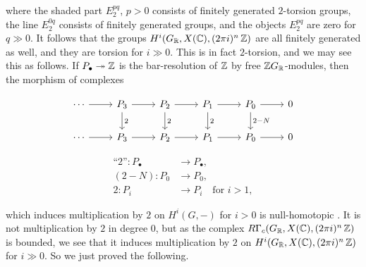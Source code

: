 \begin{center}

\end{center}

\noindent where the shaded part $E_2^{pq}$, $p > 0$ consists of finitely
generated $2$-torsion groups, the line $E_2^{0q}$ consists of finitely generated
groups, and the objects $E_2^{pq}$ are zero for $q \gg 0$. It follows that the
groups $H^i (G_{\mathbb{R}}, X (\mathbb{C}), (2\pi i)^n\,\mathbb{Z})$ are all finitely generated as
well, and they are torsion for $i \gg 0$. This is in fact $2$-torsion, and we
may see this as follows. If $P_\bullet \twoheadrightarrow \mathbb{Z}$ is the bar-resolution of $\mathbb{Z}$
by free $\mathbb{Z} G_{\mathbb{R}}$-modules, then the morphism of complexes

\[ \begin{tikzcd}
    \cdots\ar{r} & P_3\ar{r}\ar{d}{2} & P_2\ar{r}\ar{d}{2} & P_1\ar{r}\ar{d}{2} & P_0\ar{r}\ar{d}{2-N} & 0 \\
    \cdots\ar{r} & P_3\ar{r} & P_2\ar{r} & P_1\ar{r} & P_0\ar{r} & 0
  \end{tikzcd} \]

\begin{align*}
  \text{``}2\text{''}\colon P_\bullet & \to P_\bullet,\\
  (2-N)\colon P_0 & \to P_0,\\
  2\colon P_i & \to P_i \quad\text{for }i > 1,
\end{align*}

\noindent which induces multiplication by $2$ on $H^i (G,-)$ for $i > 0$ is
null-homotopic \cite[Theorem 6.5.8]{Weibel-94}. It is not multiplication by $2$
in degree $0$, but as the complex $R\Gamma_c (G_{\mathbb{R}}, X (\mathbb{C}), (2\pi i)^n\,\mathbb{Z})$
is bounded, we see that it induces multiplication by $2$ on
$H^i (G_{\mathbb{R}}, X (\mathbb{C}), (2\pi i)^n\,\mathbb{Z})$ for $i \gg 0$. So we just proved the
following.

